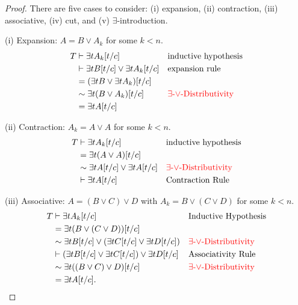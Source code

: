 \documentclass[12pt]{article}
\theoremstyle{definition}
\newcommand{\<}{\langle}
\renewcommand{\>}{\rangle}
\begin{document}
\begin{proof}
    There are five cases to consider: (i) expansion, (ii) contraction, (iii) associative, (iv) cut, and (v) $\exists$-introduction.

    (i) Expansion: $A = B \lor A_k$ for some $k < n$.
    \begin{align*}
        T
            &\vdash \exists{t}A_k[t/c] 
                && \text{inductive hypothesis}\\
            &\vdash \exists{t}B[t/c] \lor \exists{t}A_k[t/c] 
                && \text{expansion rule}\\
            &= (\exists{t}B \lor \exists{t}A_k)[t/c] \\
            &\sim \exists{t}(B \lor A_k)[t/c] 
                && \text{\textcolor{red}{$\exists$-$\lor$-Distributivity}}\\
            &= \exists{t}A[t/c]
    \end{align*}

    (ii) Contraction: $A_k = A \lor A$ for some $k < n$.
    \begin{align*}
        T 
            &\vdash \exists{t}A_k[t/c] 
                && \text{inductive hypothesis}\\
            &= \exists{t}(A \lor A)[t/c] \\
            &\sim \exists{t}A[t/c] \lor \exists{t}A[t/c] 
                && \text{\textcolor{red}{$\exists$-$\lor$-Distributivity}}\\
            &\vdash \exists{t}A[t/c]
                &&\text{Contraction Rule} \\
    \end{align*}
    
    (iii) Associative: $A = (B \lor C) \lor D$ with $A_k = B \lor (C \lor D)$ for some $k < n$.
    \begin{align*}
        T 
            &\vdash \exists{t}A_k[t/c] 
                &&\text{Inductive Hypothesis}\\
            &= \exists{t}(B \lor (C \lor D))[t/c] \\
            &\sim \exists{t}B[t/c] \lor (\exists{t}C[t/c] \lor \exists{t}D[t/c])  
                &&\text{\textcolor{red}{$\exists$-$\lor$-Distributivity}}\\
            &\vdash (\exists{t}B[t/c] \lor \exists{t}C[t/c]) \lor \exists{t}D[t/c]
                &&\text{Associativity Rule}\\
            &\sim \exists{t}((B \lor C) \lor D)[t/c]
                &&\text{\textcolor{red}{$\exists$-$\lor$-Distributivity}}\\
            &= \exists{t}A[t/c].
    \end{align*}


\end{proof}
\end{document}
